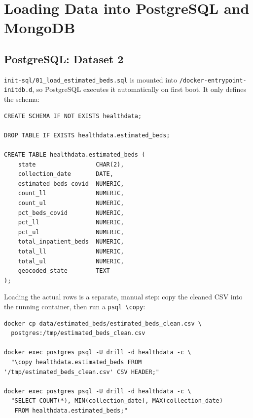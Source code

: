 \documentclass[11pt,a4paper]{article}
\begin{document}
\section{Loading Data into PostgreSQL and MongoDB}
\label{sec:loading}

\subsection{PostgreSQL: Dataset 2}
\texttt{init-sql/01\_load\_estimated\_beds.sql} is mounted into
\texttt{/docker-entrypoint-initdb.d}, so PostgreSQL executes it automatically on
first boot. It only defines the schema:

\begin{lstlisting}[style=sqlstyle, caption={init-sql/01\_load\_estimated\_beds.sql -- schema definition for Dataset 2.}]
CREATE SCHEMA IF NOT EXISTS healthdata;

DROP TABLE IF EXISTS healthdata.estimated_beds;

CREATE TABLE healthdata.estimated_beds (
    state                 CHAR(2),
    collection_date       DATE,
    estimated_beds_covid  NUMERIC,
    count_ll              NUMERIC,
    count_ul              NUMERIC,
    pct_beds_covid        NUMERIC,
    pct_ll                NUMERIC,
    pct_ul                NUMERIC,
    total_inpatient_beds  NUMERIC,
    total_ll              NUMERIC,
    total_ul              NUMERIC,
    geocoded_state        TEXT
);
\end{lstlisting}

Loading the actual rows is a separate, manual step: copy the cleaned CSV into the running container, then run a
\texttt{psql~\textbackslash copy}:

\begin{lstlisting}[style=bashstyle]
docker cp data/estimated_beds/estimated_beds_clean.csv \
  postgres:/tmp/estimated_beds_clean.csv

docker exec postgres psql -U drill -d healthdata -c \
  "\copy healthdata.estimated_beds FROM '/tmp/estimated_beds_clean.csv' CSV HEADER;"

docker exec postgres psql -U drill -d healthdata -c \
  "SELECT COUNT(*), MIN(collection_date), MAX(collection_date)
   FROM healthdata.estimated_beds;"
\end{lstlisting}
\end{document}

